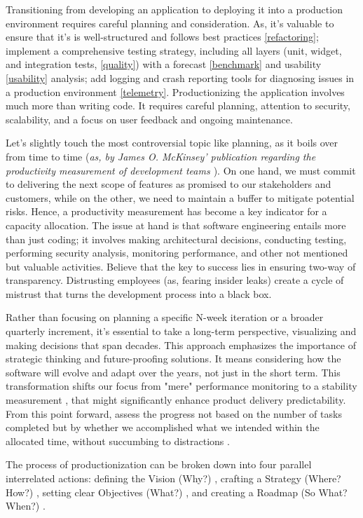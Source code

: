

Transitioning from developing an application to deploying it into a production environment requires careful planning 
and consideration. As, it's valuable to ensure that it's is well-structured and follows best practices 
\ref{refactoring}; implement a comprehensive testing strategy, including all layers (unit, widget, and integration 
tests, \ref{quality}) with a forecast \ref{benchmark} and usability \ref{usability} analysis; add logging and crash 
reporting tools for diagnosing issues in a production environment \ref{telemetry}. Productionizing the application 
involves much more than writing code. It requires careful planning, attention to security, scalability, and a focus 
on user feedback and ongoing maintenance. 

Let's slightly touch the most controversial topic like planning, as it boils over from time to time (\emph{as, by James 
O. McKinsey' publication regarding the productivity measurement of development teams \cite{McKi23}}). On one hand, we 
must commit to delivering the next scope of features as promised to our stakeholders and customers, while on the other, 
we need to maintain a buffer to mitigate potential risks. Hence, a productivity measurement has become a key indicator 
for a capacity allocation. The issue at hand is that software engineering entails more than just coding; it involves 
making architectural decisions, conducting testing, performing security analysis, monitoring performance, and other 
not mentioned but valuable activities. Believe that the key to success lies in ensuring two-way of transparency. 
Distrusting employees (as, fearing insider leaks) create a cycle of mistrust that turns the development process into a 
black box. 

Rather than focusing on planning a specific N-week iteration or a broader quarterly increment, it's essential to take a 
long-term perspective, visualizing and making decisions that span decades. This approach emphasizes the importance of 
strategic thinking and future-proofing solutions. It means considering how the software will evolve and adapt over the 
years, not just in the short term. This transformation shifts our focus from "mere" performance monitoring to a 
stability measurement \cite{Heal23}, that might significantly enhance product delivery predictability.
From this point forward, assess the progress not based on the number of tasks completed but by whether we 
accomplished what we intended within the allocated time, without succumbing to distractions \cite{Eyal20}.

The process of productionization can be broken down into four parallel interrelated actions: defining the Vision (Why?) 
\cite{Wall19}, crafting a Strategy (Where? How?) \cite{Lafl13}, setting clear Objectives (What?) \cite{Doer18}, and 
creating a Roadmap (So What? When?) \cite{Lomb17}.
